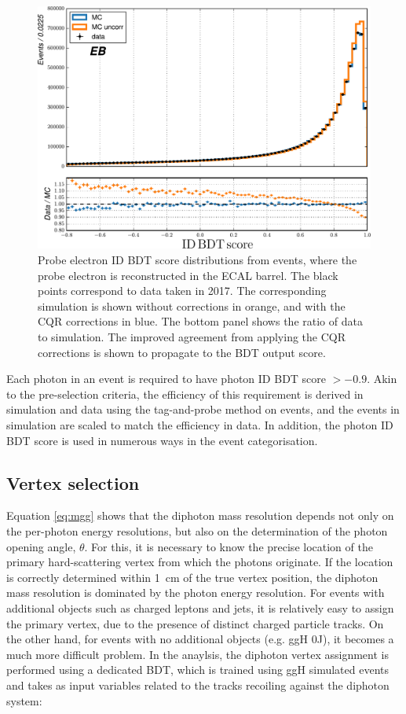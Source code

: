 \begin{figure}[htb!]
  \centering
  \includegraphics[width=.6\textwidth]{Figures/hgg_overview/dataMC_probePhoIdMVA_0_corr.pdf}
  \caption[Corrections from the chained quantile regression method in the ID BDT output score]
  {
    Probe electron ID BDT score distributions from \Zee events, where the probe electron is reconstructed in the ECAL barrel. The black points correspond to data taken in 2017. The corresponding simulation is shown without corrections in orange, and with the CQR corrections in blue. The bottom panel shows the ratio of data to simulation. The improved agreement from applying the CQR corrections is shown to propagate to the BDT output score.
  }
  \label{fig:photon_id_2}
\end{figure}

Each photon in an event is required to have photon ID BDT score $>-0.9$. Akin to the pre-selection criteria, the efficiency of this requirement is derived in simulation and data using the tag-and-probe method on \Zee events, and the events in simulation are scaled to match the efficiency in data. In addition, the photon ID BDT score is used in numerous ways in the event categorisation.

\subsection{Vertex selection}\label{sec:vertex_selection}
Equation \ref{eq:mgg} shows that the diphoton mass resolution depends not only on the per-photon energy resolutions, but also on the determination of the photon opening angle, $\theta$. For this, it is necessary to know the precise location of the primary hard-scattering vertex from which the photons originate. If the location is correctly determined within 1~cm of the true vertex position, the diphoton mass resolution is dominated by the photon energy resolution. For events with additional objects such as charged leptons and jets, it is relatively easy to assign the primary vertex, due to the presence of distinct charged particle tracks. On the other hand, for \Hgg events with no additional objects (e.g. ggH 0J), it becomes a much more difficult problem. In the \Hgg anaylsis, the diphoton vertex assignment is performed using a dedicated BDT, which is trained using ggH \Hgg simulated events and takes as input variables related to the tracks recoiling against the diphoton system:

